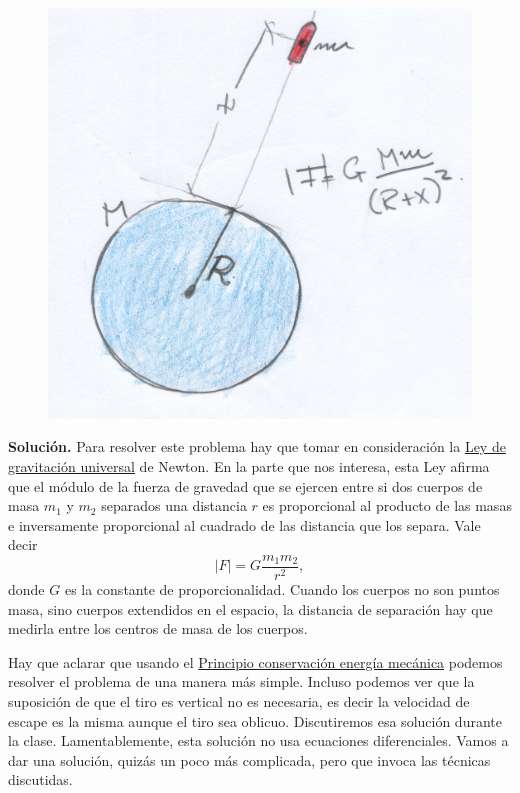 \documentclass{article}
\begin{document}
\begin{figure}
\includegraphics[scale=.075]{imagenes/tiro_vertical.jpg}
\end{figure}
 \noindent\textbf{Solución.} Para resolver este problema hay que tomar en consideración la
\href{http://es.wikipedia.org/wiki/Ley_de_gravitación_universal}{Ley de gravitación universal} de Newton. En la parte que nos interesa, esta Ley afirma
que el módulo de la fuerza de gravedad que se ejercen entre si dos cuerpos de masa $m_1$ y $m_2$ separados una distancia $r$ es proporcional al producto de las masas  
e inversamente proporcional al cuadrado de las distancia que los separa. Vale decir
\[|F|=G\frac{m_1m_2}{r^2},\]
donde $G$ es la constante de proporcionalidad.
Cuando los cuerpos no son puntos masa, sino cuerpos extendidos en el espacio, la distancia de separación hay que medirla entre los centros de masa de los cuerpos. 



Hay que aclarar que usando el \href{https://docs.google.com/file/d/0B80iJ0HgObRRWll6MlJFSjFNMGc/edit}{Principio conservación energía mecánica} podemos resolver
el problema de una manera más simple. Incluso podemos ver que la suposición de que el tiro es vertical no es necesaria, es decir la velocidad de escape es la misma aunque
el tiro sea oblicuo. Discutiremos esa solución durante la clase. Lamentablemente,  esta solución no usa ecuaciones diferenciales.
Vamos a dar una solución, quizás un poco más complicada, pero que invoca las técnicas 
discutidas.
\end{document}
